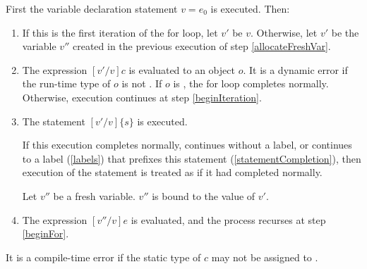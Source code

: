 \documentclass[makeidx]{article}
\begin{document}
{\LMHash{}%
First the variable declaration statement \VAR{} $v = e_0$ is executed.
Then:

\begin{enumerate}
\item
  \label{beginFor}
  If this is the first iteration of the for loop, let $v'$ be $v$.
  Otherwise, let $v'$ be the variable $v''$ created in
  the previous execution of step \ref{allocateFreshVar}.
\item
  The expression $[v'/v]c$ is evaluated to an object $o$.
  It is a dynamic error if the run-time type of $o$ is not .
  If $o$ is \FALSE, the for loop completes normally.
  Otherwise, execution continues at step \ref{beginIteration}.
\item
  \label{beginIteration}
  The statement $[v'/v]\{s\}$ is executed.

  If this execution completes normally, continues without a label,
  or continues to a label (\ref{labels})
  that prefixes this \FOR{} statement (\ref{statementCompletion}),
  then execution of the statement is treated as if it had completed normally.

  \label{allocateFreshVar}
  Let $v''$ be a fresh variable.
  $v''$ is bound to the value of $v'$.
\item
  The expression $[v''/v]e$ is evaluated, and
  the process recurses at step \ref{beginFor}.
\end{enumerate}


\LMHash{}%
It is a compile-time error if the static type of $c$
may not be assigned to .


}
\end{document}
